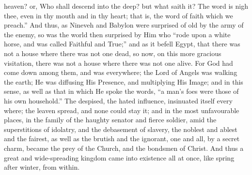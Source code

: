 heaven? or, Who shall descend into the deep? but what saith it? The
word is nigh thee, even in thy mouth and in thy heart; that is, the
word of faith which we preach.'' And thus, as Nineveh and Babylon
were surprised of old by the army of the enemy, so was the world then
surprised by Him who ``rode upon a white horse, and was called
Faithful and True;'' and as it befell Egypt, that there was not a
house where there was not one dead, so now, on this more gracious
visitation, there was not a house where there was not one alive. For
God had come down among them, and was everywhere; the Lord of Angels
was walking the earth; He was diffusing His Presence, and multiplying
His Image; and in this sense, as well as that in which He spoke the
words, ``a man's foes were those of his own household.'' The
despised, the hated influence, insinuated itself every where; the
leaven spread, and none could stay it; and in the most unfavourable
places, in the family of the haughty senator and fierce soldier, amid
the superstitions of idolatry, and the debasement of slavery, the
noblest and ablest and the fairest, as well as the brutish and the
ignorant, one and all, by a secret charm, became the prey of the
Church, and the bondsmen of Christ. And thus a great and
wide-spreading kingdom came into existence all at once, like spring
after winter, from within.

